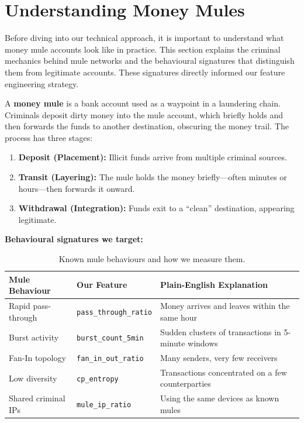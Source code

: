 \documentclass[11pt, a4paper]{article}
\begin{document}
\section{Understanding Money Mules}

Before diving into our technical approach, it is important to understand what money mule
accounts look like in practice. This section explains the criminal mechanics behind mule
networks and the behavioural signatures that distinguish them from legitimate accounts.
These signatures directly informed our feature engineering strategy.

\medskip

A \textbf{money mule} is a bank account used as a waypoint in a laundering chain. Criminals
deposit dirty money into the mule account, which briefly holds and then forwards the funds to
another destination, obscuring the money trail. The process has three stages:

\begin{enumerate}[leftmargin=1.5em, itemsep=2pt]
    \item \textbf{Deposit (Placement):} Illicit funds arrive from multiple criminal sources.
    \item \textbf{Transit (Layering):} The mule holds the money briefly---often minutes or
          hours---then forwards it onward.
    \item \textbf{Withdrawal (Integration):} Funds exit to a ``clean'' destination, appearing
          legitimate.
\end{enumerate}

\textbf{Behavioural signatures we target:}

\begin{table}[H]
\centering\small
\caption{Known mule behaviours and how we measure them.}
\begin{tabular}{@{}p{3.8cm}p{4cm}p{5cm}@{}}
\toprule
\textbf{Mule Behaviour} & \textbf{Our Feature} & \textbf{Plain-English Explanation} \\
\midrule
Rapid pass-through &
    \texttt{pass\_through\_ratio} &
    Money arrives and leaves within the same hour \\[4pt]
Burst activity &
    \texttt{burst\_count\_5min} &
    Sudden clusters of transactions in 5-minute windows \\[4pt]
Fan-In topology &
    \texttt{fan\_in\_out\_ratio} &
    Many senders, very few receivers \\[4pt]
Low diversity &
    \texttt{cp\_entropy} &
    Transactions concentrated on a few counterparties \\[4pt]
Shared criminal IPs &
    \texttt{mule\_ip\_ratio} &
    Using the same devices as known mules \\
\bottomrule
\end{tabular}
\end{table}
\end{document}
